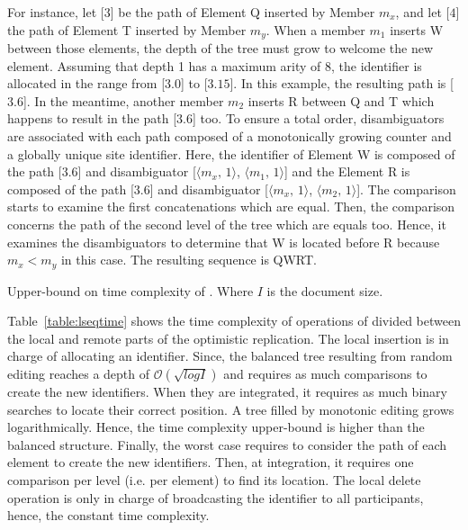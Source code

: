 \begin{asparadesc}
  For instance, let [$3$] be the path of Element Q inserted by Member $m_x$, and let
  [$4$] the path of Element T inserted by Member $m_y$. When a member $m_1$ inserts W
  between those elements, the depth of the tree must grow to welcome the new
  element. Assuming that depth 1 has a maximum arity of 8, the identifier is
  allocated in the range from [$3.0$] to [$3.15$].  In this example, the resulting
  path is [$3.6$]. In the meantime, another member $m_2$ inserts R between Q and T
  which happens to result in the path [$3.6$] too. To ensure a total order,
  disambiguators are associated with each path composed of a monotonically
  growing counter and a globally unique site identifier. Here, the identifier of
  Element W is composed of the path [$3.6$] and disambiguator
  [$\langle m_x,\,1\rangle$, $\langle m_1,\,1\rangle$] and the Element R is composed of
  the path [$3.6$] and disambiguator [$\langle m_x,\,1\rangle$,
  $\langle m_2,\,1\rangle$].  The comparison starts to examine the first
  concatenations which are equal.  Then, the comparison concerns the path of the
  second level of the tree which are equals too. Hence, it examines the
  disambiguators to determine that W is located before R because $m_x < m_y$ in
  this case. The resulting sequence is QWRT.  
\end{asparadesc}

\begin{table}
  \centering
  
  \caption{\label{table:lseqtime}
    Upper-bound on time complexity of \LSEQ. Where $I$ is the document size.}
\end{table}

Table~\ref{table:lseqtime} shows the time complexity of operations of \LSEQ
divided between the local and remote parts of the optimistic replication. The
local insertion is in charge of allocating an identifier. Since, the balanced
tree resulting from random editing reaches a depth of
$\mathcal{O}(\sqrt{log I})$ and requires as much comparisons to create the new
identifiers. When they are integrated, it requires as much binary searches to
locate their correct position. A tree filled by monotonic editing grows
logarithmically. Hence, the time complexity upper-bound is higher than the
balanced structure. Finally, the worst case requires to consider the path of
each element to create the new identifiers. Then, at integration, it requires
one comparison per level (i.e. per element) to find its location. The local
delete operation is only in charge of broadcasting the identifier to all
participants, hence, the constant time complexity.

